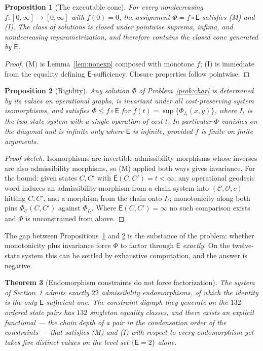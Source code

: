 \documentclass[11pt]{article}
\newtheorem{theorem}{Theorem}[section]
\newtheorem{proposition}[theorem]{Proposition}
\theoremstyle{remark}
\newcommand{\C}{\mathcal{C}}
\newcommand{\Ops}{\mathcal{O}}
\newcommand{\E}{\mathsf{E}}
\begin{document}
\begin{proposition}[The executable cone]\label{prop:cone}
For every nondecreasing $f\colon[0,\infty]\to[0,\infty]$ with
$f(0)=0$, the assignment $\Phi = f\circ\E$ satisfies (M) and (I). The
class of solutions is closed under pointwise suprema, infima, and
nondecreasing reparametrization, and therefore contains the closed
cone generated by $\E$.
\end{proposition}

\begin{proof}
(M) is Lemma~\ref{lem:nonexp} composed with monotone $f$; (I) is
immediate from the equality defining $\E$-sufficiency. Closure
properties follow pointwise.
\end{proof}

\begin{proposition}[Rigidity]\label{prop:rigidity}
Any solution $\Phi$ of Problem~\ref{prob:char} is determined by its
values on operational graphs, is invariant under all cost-preserving
system isomorphisms, and satisfies $\Phi \le f\circ\E$ for
$f(t)=\sup\{\Phi_{I_t}(x,y)\}$, where $I_t$ is the two-state system
with a single operation of cost $t$. In particular $\Phi$ vanishes on
the diagonal and is infinite only where $\E$ is infinite, provided
$f$ is finite on finite arguments.
\end{proposition}

\begin{proof}[Proof sketch]
Isomorphisms are invertible admissibility morphisms whose inverses
are also admissibility morphisms, so (M) applied both ways gives
invariance. For the bound: given states $C,C'$ with
$\E(C,C')=t<\infty$, any operational geodesic word induces an
admissibility morphism from a chain system into $(\C,\Ops,c)$ hitting
$C,C'$, and a morphism from the chain onto $I_t$; monotonicity along
both pins $\Phi_{\C}(C,C')$ against $\Phi_{I_t}$. Where
$\E(C,C')=\infty$ no such comparison exists and $\Phi$ is
unconstrained from above.
\end{proof}

The gap between Propositions~\ref{prop:cone} and \ref{prop:rigidity}
is the substance of the problem: whether monotonicity plus invariance
force $\Phi$ to factor through $\E$ \emph{exactly}. On the
twelve-state system this can be settled by exhaustive computation, and
the answer is negative.

\begin{theorem}[Endomorphism constraints do not force factorization]
\label{thm:nofactor}
The system of Section~1 admits exactly $22$ admissibility
endomorphisms, of which the identity is the only $\E$-sufficient one.
The constraint digraph they generate on the $132$ ordered state pairs
has $132$ singleton equality classes, and there exists an explicit
functional --- the chain depth of a pair in the condensation order of
the constraints --- that satisfies (M) and (I) with respect to every
endomorphism yet takes five distinct values on the level set
$\{\E=2\}$ alone.
\end{theorem}
\end{document}
